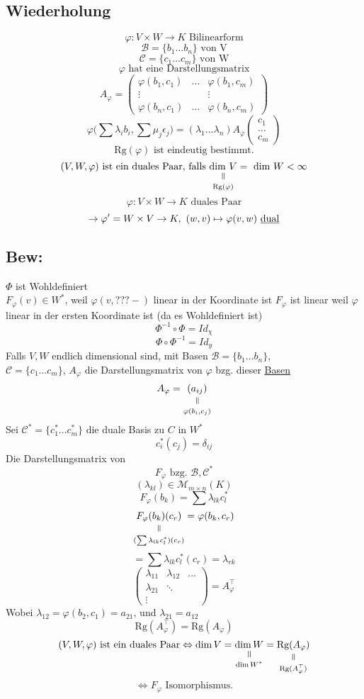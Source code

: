 \documentclass[titlepage,12pt,a4paper,ngerman]{report}
\newcommand{\verteq}{\rotatebox{90}{$\,=$}}
\newcommand{\equalto}[2]{\underset{\scriptstyle\overset{\mkern4mu\verteq}{#2}}{#1}}
\newcommand{\tx}[1]{\textrm{#1}}
\begin{document}
\subsection{Wiederholung}
$$\varphi: V \times W \to K \tx{ Bilinearform}$$
$$\mathcal B = \{b_1 \dots b_n\} \tx{ von V}$$
$$\mathcal C = \{c_1 \dots c_m\} \tx{ von W}$$
$$\varphi \tx{ hat eine Darstellungsmatrix}$$
$$A_\varphi = 
\begin{pmatrix}
\varphi(b_1, c_1) & \dots & \varphi(b_1, c_m) \\
\vdots & & \vdots \\
\varphi(b_n, c_1) & \dots & \varphi(b_n, c_m)	
\end{pmatrix}$$
$$\varphi \bigg( \sum \lambda_i b_i, \sum \mu_j \epsilon_j \bigg) = (\lambda_1 \dots \lambda_n) A_\varphi \begin{pmatrix} c_1 \\ \dots \\ c_m \end{pmatrix}$$
$$\tx{Rg}(\varphi) \tx{ ist eindeutig bestimmt.}$$
$$(V, W, \varphi) \tx{ ist ein duales Paar, falls } \equalto{\tx{dim } V}{\tx{Rg}(\varphi)} = \tx{ dim } W < \infty$$
$$ \varphi: V \times W \to K \tx{ duales Paar}$$
$$\rightarrow \varphi' = W \times V \to K,\ (w,v) \mapsto \varphi(v,w) \tx{ \underline{dual}}$$
\subsection{Bew:}
$ \Phi $ ist Wohldefiniert\\
$ F_\varphi (v) \in W^* $, weil $ \varphi(v,???-) $ linear in der Koordinate ist $ F_\varphi $ ist linear weil $ \varphi $ linear in der ersten Koordinate ist (da es Wohldefiniert ist)
$$\Phi^{-1} \circ \Phi = Id_\chi$$
$$\Phi \circ \Phi^{-1} = Id_y$$
Falls $V,W$ endlich dimensional sind, mit Basen $\mathcal{B} = \{b_1 \dots b_n\}$,\\ $\mathcal{C} = \{c_1 \dots c_m\}$, $A_\varphi$ die Darstellungsmatrix von $\varphi$ bzg. dieser \underline{\underline{Basen}}
$$A_\varphi = \equalto{(a_{ij})}{\varphi(b_i, c_j)}$$
Sei $\mathcal C^* = \{c_1^* \dots c_m^*\}$ die duale Basis zu $C$ in $W^*$ 
$$c_i^*(c_j) = \delta_{ij}$$
Die Darstellungsmatrix von
$$F_\varphi \tx{ bzg. } \mathcal B, \mathcal C^*$$
$$(\lambda_{kl}) \in \mathcal M_{m \times n}(K)$$
$$F_\varphi (b_k) = \sum \lambda_{lk} c^*_l$$
$$\equalto{F_\varphi (b_k) (c_r)}{(\sum \lambda_{lk}c_l^*)(c_r)} = \varphi (b_k, c_r)$$
$$= \sum \lambda_{lk}c_l^*(c_r) = \lambda_{rk}$$
$$\begin{pmatrix}
\lambda_{11} & \lambda_{12} & \dots \\
\lambda_{21} & \ddots & \\
\vdots & & 
\end{pmatrix} = A_\varphi^\top$$
Wobei $\lambda_{12} = \varphi(b_2, c_1) = a_{21}$, und $\lambda_{21} = a_{12}$
$$\tx{Rg}(A_\varphi^\top) = \tx{Rg}(A_\varphi)$$
$$(V,W,\varphi) \tx{ ist ein duales Paar} \Leftrightarrow \dim V = \equalto{\dim W}{\dim W^*} = \equalto{\tx{Rg}(A_\varphi)}{\tx{Rg}(A_\varphi^\top)}$$ 
$$\Leftrightarrow F_\varphi \tx{ Isomorphismus.}$$
\end{document}
